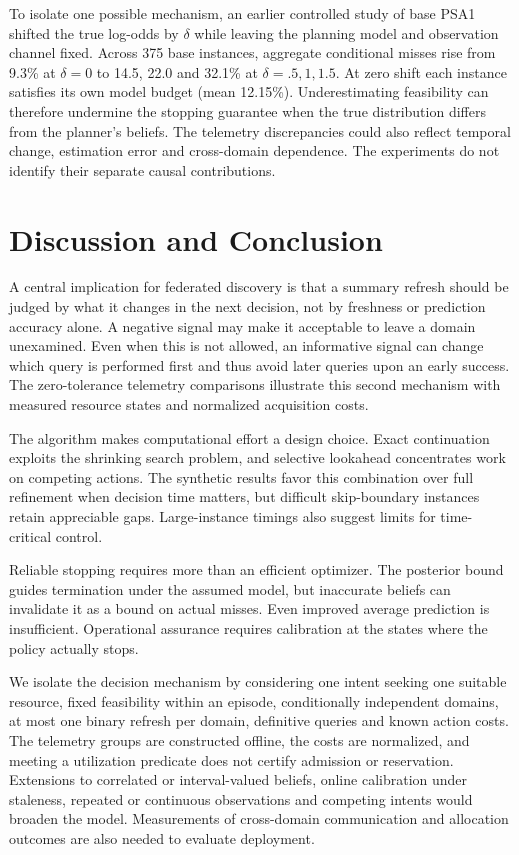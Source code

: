 \documentclass[conference]{IEEEtran}
\begin{document}
To isolate one possible mechanism, an earlier controlled study of base PSA1 shifted the true log-odds by $\delta$ while leaving the planning model and observation channel fixed. Across 375 base instances, aggregate conditional misses rise from 9.3\% at $\delta=0$ to 14.5, 22.0 and 32.1\% at $\delta=.5,1,1.5$. At zero shift each instance satisfies its own model budget (mean 12.15\%). Underestimating feasibility can therefore undermine the stopping guarantee when the true distribution differs from the planner's beliefs. The telemetry discrepancies could also reflect temporal change, estimation error and cross-domain dependence. The experiments do not identify their separate causal contributions.

\section{Discussion and Conclusion}
\label{sec:discussion}
A central implication for federated discovery is that a summary refresh should be judged by what it changes in the next decision, not by freshness or prediction accuracy alone. A negative signal may make it acceptable to leave a domain unexamined. Even when this is not allowed, an informative signal can change which query is performed first and thus avoid later queries upon an early success. The zero-tolerance telemetry comparisons illustrate this second mechanism with measured resource states and normalized acquisition costs.

The algorithm makes computational effort a design choice. Exact continuation exploits the shrinking search problem, and selective lookahead concentrates work on competing actions. The synthetic results favor this combination over full refinement when decision time matters, but difficult skip-boundary instances retain appreciable gaps. Large-instance timings also suggest limits for time-critical control.

Reliable stopping requires more than an efficient optimizer. The posterior bound guides termination under the assumed model, but inaccurate beliefs can invalidate it as a bound on actual misses. Even improved average prediction is insufficient. Operational assurance requires calibration at the states where the policy actually stops.

We isolate the decision mechanism by considering one intent seeking one suitable resource, fixed feasibility within an episode, conditionally independent domains, at most one binary refresh per domain, definitive queries and known action costs. The telemetry groups are constructed offline, the costs are normalized, and meeting a utilization predicate does not certify admission or reservation. Extensions to correlated or interval-valued beliefs, online calibration under staleness, repeated or continuous observations and competing intents would broaden the model. Measurements of cross-domain communication and allocation outcomes are also needed to evaluate deployment.
\end{document}
